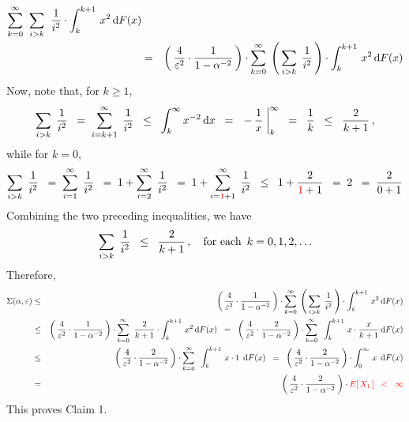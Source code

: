 \begin{enumerate}
\begin{eqnarray*}
	\overset{\infty}{\underset{k=0}{\sum}}\;\;
	\underset{i > k}{\sum}\;\;
	\dfrac{1}{i^{2}} \cdot  \int_{k}^{k+1}\, x^{2} \,\textnormal{d} F(x)
\\
& = &
	\left(\,\dfrac{4}{\varepsilon^{2}} \cdot \dfrac{1}{1-\alpha^{-2}}\,\right) \cdot
	\overset{\infty}{\underset{k=0}{\sum}}\;
	\left(\,\underset{i > k}{\sum}\;\, \dfrac{1}{i^{2}}\,\right) \cdot
	\int_{k}^{k+1}\, x^{2} \,\textnormal{d} F(x)
\end{eqnarray*}
Now, note that, for $k \geq 1$,
\begin{equation*}
\underset{i > k}{\sum}\;\, \dfrac{1}{i^{2}}
\;\; = \;
	\overset{\infty}{\underset{i = k+1}{\sum}}\;\, \dfrac{1}{i^{2}}
\;\; \leq \;\;
	\int_{k}^{\infty}x^{-2}\,\textnormal{d} x
\;\; = \;\;
	\left. -\,\dfrac{1}{x}\;\right\vert_{k}^{\infty}
\;\; = \;\;
	\dfrac{1}{k}
\;\; \leq \;\;
	\dfrac{2}{k+1}\,,
\end{equation*}
while for $k = 0$,
\begin{equation*}
\underset{i > k}{\sum}\;\, \dfrac{1}{i^{2}}
\;\; = \;
	\overset{\infty}{\underset{i = 1}{\sum}}\;\, \dfrac{1}{i^{2}}
\;\; = \;
	1 + \overset{\infty}{\underset{i = 2}{\sum}}\;\, \dfrac{1}{i^{2}}
\;\; = \;
	1 + \overset{\infty}{\underset{i = {\color{red}1}+1}{\sum}}\;\, \dfrac{1}{i^{2}}
\;\; \leq \;\;
	1 + \dfrac{2}{{\color{red}1}+1}
\;\; = \;
	2
\;\; = \;
	\dfrac{2}{0 + 1}
\end{equation*}
Combining the two preceding inequalities, we have
\begin{equation*}
\underset{i > k}{\sum}\;\, \dfrac{1}{i^{2}}
\;\; \leq \;\;
	\dfrac{2}{k + 1}\,,
\quad\textnormal{for each \,$k = 0, 1, 2, \ldots$}
\end{equation*}
Therefore,
\begin{eqnarray*}
\Sigma(\alpha,\varepsilon)
& \leq &
	\left(\,\dfrac{4}{\varepsilon^{2}} \cdot \dfrac{1}{1-\alpha^{-2}}\,\right) \cdot
	\overset{\infty}{\underset{k=0}{\sum}}\;
	\left(\,\underset{i > k}{\sum}\;\, \dfrac{1}{i^{2}}\,\right) \cdot
	\int_{k}^{k+1}\, x^{2} \,\textnormal{d} F(x)
\\
& \leq &
	\left(\,\dfrac{4}{\varepsilon^{2}} \cdot \dfrac{1}{1-\alpha^{-2}}\,\right) \cdot
		\overset{\infty}{\underset{k=0}{\sum}}\;\;
		\dfrac{2}{k+1} \cdot
		\int_{k}^{k+1}\, x^{2} \,\textnormal{d} F(x)
	\;\; = \;\;
		\left(\,\dfrac{4}{\varepsilon^{2}} \cdot \dfrac{2}{1-\alpha^{-2}}\,\right) \cdot
		\overset{\infty}{\underset{k=0}{\sum}}\;\;
		\int_{k}^{k+1}\, x \cdot \dfrac{x}{k+1} \,\textnormal{d} F(x)
\\
& \leq &
	\left(\,\dfrac{4}{\varepsilon^{2}} \cdot \dfrac{2}{1-\alpha^{-2}}\,\right) \cdot
	\overset{\infty}{\underset{k=0}{\sum}}\;\;
	\int_{k}^{k+1}\, x \cdot 1 \;\,\textnormal{d} F(x)
	\;\; = \;\;
	\left(\,\dfrac{4}{\varepsilon^{2}} \cdot \dfrac{2}{1-\alpha^{-2}}\,\right) \cdot
	\int_{0}^{\infty}\, x \;\,\textnormal{d} F(x)
\\
& = &
		\left(\,\dfrac{4}{\varepsilon^{2}} \cdot \dfrac{2}{1-\alpha^{-2}}\,\right) \cdot {\color{red}E\!\left[\,X_{1}\,\right]
	\;\; < \;\;
		\infty}
\end{eqnarray*}
This proves Claim 1.


\end{enumerate}
